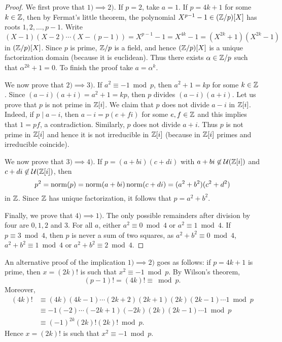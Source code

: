 \begin{proof}
    We first prove that $1)\implies 2)$. If $p=2$, take $a=1$. If $p=4k+1$ for some $k\in\mathbb{Z}$, then
    by Fermat's little theorem, the polynomial 
    $X^{p-1}-1\in(\mathbb{Z}/p)[X]$ has roots $1,2,\dots,p-1$. Write
    \[
    (X-1)(X-2)\cdots (X-(p-1))=X^{p-1}-1=X^{4k}-1=(X^{2k}+1)(X^{2k}-1)
    \]
    in $(\mathbb{Z}/p)[X]$. Since $p$ is prime, $\mathbb{Z}/p$ is a field, and hence 
    $(\mathbb{Z}/p)[X]$ is a unique factorization domain (because it is euclidean). Thus 
    there exists $\alpha\in\mathbb{Z}/p$ such that $\alpha^{2k}+1=0$. To finish the proof
    take $a=\alpha^k$. 
    
    We now prove that $2)\implies 3)$. If $a^2\equiv-1\bmod p$, then $a^2+1=kp$ 
    for some $k\in\mathbb{Z}$. Since $(a-i)(a+i)=a^2+1=kp$, then $p$ divides $(a-i)(a+i)$. Let us prove that $p$ is not prime in $\mathbb{Z}[i]$. 
    We claim that $p$ does not divide $a-i$ in $\mathbb{Z}[i]$. Indeed, if $p\mid a-i$, then
    $a-i=p(e+fi)$ for some $e,f\in\mathbb{Z}$ and this implies that $1=pf$, a contradiction. Similarly,
    $p$ does not divide $a+i$. Thus $p$ is not prime in $\mathbb{Z}[i]$ 
    and hence it is not irreducible in $\mathbb{Z}[i]$ (because in $\mathbb{Z}[i]$ primes and irreducible coincide). 
    
    We now prove that $3)\implies 4)$. If $p=(a+bi)(c+di)$ with $a+bi\not\in\mathcal{U}(\mathbb{Z}[i])$
    and  $c+di\not\in\mathcal{U}(\mathbb{Z}[i])$, then
    \[
    p^2=\operatorname{norm}(p)=\operatorname{norm}(a+bi)\operatorname{norm}(c+di)=(a^2+b^2)(c^2+d^2)
    \]
    in $\mathbb{Z}$. Since $\mathbb{Z}$ has unique factorization, it follows that $p=a^2+b^2$. 
    
    Finally, we prove that $4)\implies 1)$. 
    The only possible remainders after division by four are $0,1,2$ and $3$.  
    For all $a$, either $a^2\equiv 0\bmod 4$ or $a^2\equiv 1\bmod 4$. 
    If $p\equiv3\bmod 4$, then $p$ is never a sum of two squares, as 
    $a^2+b^2\equiv 0\bmod 4$, $a^2+b^2\equiv 1\bmod 4$ or $a^2+b^2\equiv 2\bmod 4$. 
\end{proof}

An alternative proof of the implication 
$1)\implies 2)$ goes as follows: if $p=4k+1$ is prime, then 
$x=(2k)!$ is such that $x^2\equiv -1\bmod p$. By Wilson's theorem, 
\[
(p-1)! = (4k)!\equiv \bmod p.
\]
Moreover,  
\begin{align*}
(4k)!&\equiv(4k)(4k-1)\cdots(2k+2)(2k+1)(2k)(2k-1)\cdots1\bmod p\\
&\equiv-1(-2)\cdots(-2k+1)(-2k)(2k)(2k-1)\cdots1\bmod p\\
&\equiv(-1)^{2k}(2k)!(2k)!\bmod p.
\end{align*}
Hence $x=(2k)!$ is such that $x^2\equiv -1\bmod p$.

